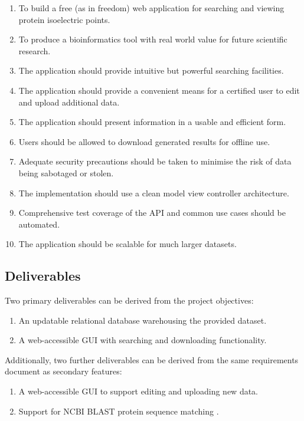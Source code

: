 \begin{enumerate}
\item To build a free (as in freedom) web application for searching and viewing
  protein isoelectric points.
\item To produce a bioinformatics tool with real world value for future
  scientific research.
\item The application should provide intuitive but powerful searching
  facilities.
\item The application should provide a convenient means for a certified user to
  edit and upload additional data.
\item The application should present information in a usable and efficient form.
\item Users should be allowed to download generated results for offline use.
\item Adequate security precautions should be taken to minimise the risk of data
  being sabotaged or stolen.
\item The implementation should use a clean model view controller architecture.
\item Comprehensive test coverage of the API and common use cases should be
  automated.
\item The application should be scalable for much larger datasets.
\end{enumerate}

\subsection{Deliverables}
Two primary deliverables can be derived from the project objectives:

\begin{enumerate}
\item An updatable relational database warehousing the provided dataset.
\item A web-accessible GUI with searching and downloading functionality.
\end{enumerate}

\noindent
Additionally, two further deliverables can be derived from the same requirements
document as secondary features:

\begin{enumerate}
\item A web-accessible GUI to support editing and uploading new data.
\item Support for NCBI BLAST protein sequence matching \cite{NCBIND}.
\end{enumerate}

